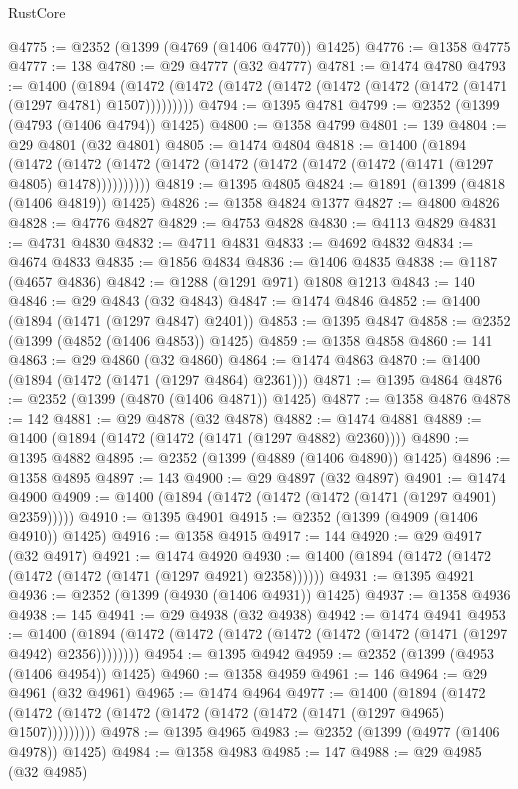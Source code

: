 \begin{lexlean}{RustCore}
\begin{coremodule}
@4775 := @2352 (@1399 (@4769 (@1406 @4770)) @1425)
@4776 := @1358 @4775
@4777 := 138
@4780 := @29 @4777 (@32 @4777)
@4781 := @1474 @4780
@4793 := @1400
    (@1894 (@1472 (@1472 (@1472 (@1472 (@1472 (@1472 (@1472 (@1471 (@1297 @4781) @1507)))))))))
@4794 := @1395 @4781
@4799 := @2352 (@1399 (@4793 (@1406 @4794)) @1425)
@4800 := @1358 @4799
@4801 := 139
@4804 := @29 @4801 (@32 @4801)
@4805 := @1474 @4804
@4818 := @1400
    (@1894
      (@1472 (@1472 (@1472 (@1472 (@1472 (@1472 (@1472 (@1472 (@1471 (@1297 @4805) @1478))))))))))
@4819 := @1395 @4805
@4824 := @1891 (@1399 (@4818 (@1406 @4819)) @1425)
@4826 := @1358 @4824 @1377
@4827 := @4800 @4826
@4828 := @4776 @4827
@4829 := @4753 @4828
@4830 := @4113 @4829
@4831 := @4731 @4830
@4832 := @4711 @4831
@4833 := @4692 @4832
@4834 := @4674 @4833
@4835 := @1856 @4834
@4836 := @1406 @4835
@4838 := @1187 (@4657 @4836)
@4842 := @1288 (@1291 @971) @1808 @1213
@4843 := 140
@4846 := @29 @4843 (@32 @4843)
@4847 := @1474 @4846
@4852 := @1400 (@1894 (@1471 (@1297 @4847) @2401))
@4853 := @1395 @4847
@4858 := @2352 (@1399 (@4852 (@1406 @4853)) @1425)
@4859 := @1358 @4858
@4860 := 141
@4863 := @29 @4860 (@32 @4860)
@4864 := @1474 @4863
@4870 := @1400 (@1894 (@1472 (@1471 (@1297 @4864) @2361)))
@4871 := @1395 @4864
@4876 := @2352 (@1399 (@4870 (@1406 @4871)) @1425)
@4877 := @1358 @4876
@4878 := 142
@4881 := @29 @4878 (@32 @4878)
@4882 := @1474 @4881
@4889 := @1400 (@1894 (@1472 (@1472 (@1471 (@1297 @4882) @2360))))
@4890 := @1395 @4882
@4895 := @2352 (@1399 (@4889 (@1406 @4890)) @1425)
@4896 := @1358 @4895
@4897 := 143
@4900 := @29 @4897 (@32 @4897)
@4901 := @1474 @4900
@4909 := @1400 (@1894 (@1472 (@1472 (@1472 (@1471 (@1297 @4901) @2359)))))
@4910 := @1395 @4901
@4915 := @2352 (@1399 (@4909 (@1406 @4910)) @1425)
@4916 := @1358 @4915
@4917 := 144
@4920 := @29 @4917 (@32 @4917)
@4921 := @1474 @4920
@4930 := @1400 (@1894 (@1472 (@1472 (@1472 (@1472 (@1471 (@1297 @4921) @2358))))))
@4931 := @1395 @4921
@4936 := @2352 (@1399 (@4930 (@1406 @4931)) @1425)
@4937 := @1358 @4936
@4938 := 145
@4941 := @29 @4938 (@32 @4938)
@4942 := @1474 @4941
@4953 := @1400 (@1894 (@1472 (@1472 (@1472 (@1472 (@1472 (@1472 (@1471 (@1297 @4942) @2356))))))))
@4954 := @1395 @4942
@4959 := @2352 (@1399 (@4953 (@1406 @4954)) @1425)
@4960 := @1358 @4959
@4961 := 146
@4964 := @29 @4961 (@32 @4961)
@4965 := @1474 @4964
@4977 := @1400
    (@1894 (@1472 (@1472 (@1472 (@1472 (@1472 (@1472 (@1472 (@1471 (@1297 @4965) @1507)))))))))
@4978 := @1395 @4965
@4983 := @2352 (@1399 (@4977 (@1406 @4978)) @1425)
@4984 := @1358 @4983
@4985 := 147
@4988 := @29 @4985 (@32 @4985)

\end{coremodule}
\end{lexlean}
